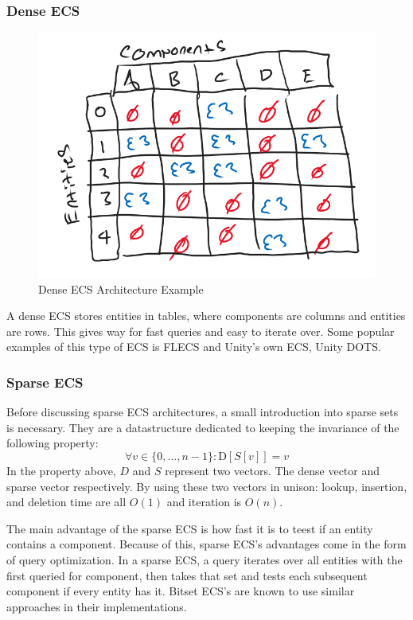 \subsubsection{Dense ECS}
\begin{figure}[htbp]
    \centering
    \includegraphics[width=0.5\linewidth]{resources/dense_ecs.png}
    \caption{Dense ECS Architecture Example}
    \label{fig:dense_ecs}
\end{figure}

A dense ECS stores entities in tables, where components are columns and entities are rows. This gives way for fast queries and easy to iterate over. Some popular examples of this type of ECS is FLECS and Unity's own ECS, Unity DOTS.

\subsubsection{Sparse ECS}
Before discussing sparse ECS architectures, a small introduction into sparse sets is necessary. They are a datastructure dedicated to keeping the invariance of the following property:
\begin{equation*}
    \forall v \in \{0,\ldots, n-1\} : \text{D}[S[v]] = v
\end{equation*}
In the property above, $D$ and $S$ represent two vectors. The dense vector and sparse vector respectively. By using these two vectors in unison: lookup, insertion, and deletion time are all $O(1)$ and iteration is $O(n)$. 

The main advantage of the sparse ECS is how fast it is to teest if an entity contains a component. Because of this, sparse ECS's advantages come in the form of query optimization. In a sparse ECS, a query iterates over all entities with the first queried for component, then takes that set and tests each subsequent component if every entity has it. Bitset ECS's are known to use similar approaches in their implementations.

